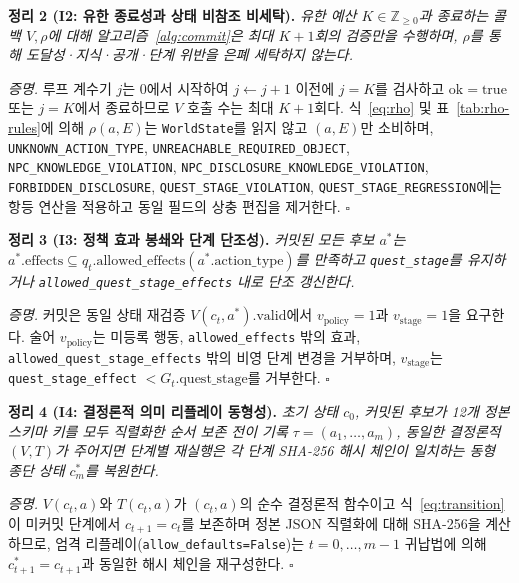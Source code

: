 \documentclass[journal]{IEEEtran}
\begin{document}
\noindent\textbf{정리 2 (I2: 유한 종료성과 상태 비참조 비세탁).} \emph{유한 예산 $K\in\mathbb{Z}_{\geq 0}$과 종료하는 콜백 $V,\rho$에 대해 알고리즘~\ref{alg:commit}은 최대 $K{+}1$회의 검증만을 수행하며, $\rho$를 통해 도달성·지식·공개·단계 위반을 은폐 세탁하지 않는다.}
\par\noindent\textit{증명.} 루프 계수기 $j$는 $0$에서 시작하여 $j\leftarrow j{+}1$ 이전에 $j=K$를 검사하고 $\mathrm{ok}=\mathrm{true}$ 또는 $j=K$에서 종료하므로 $V$ 호출 수는 최대 $K{+}1$회다. 식~\ref{eq:rho} 및 표~\ref{tab:rho-rules}에 의해 $\rho(a,E)$는 \texttt{WorldState}를 읽지 않고 $(a,E)$만 소비하며, \texttt{UNKNOWN\_\allowbreak ACTION\_\allowbreak TYPE}, \texttt{UNREACHABLE\_\allowbreak REQUIRED\_\allowbreak OBJECT}, \texttt{NPC\_}\allowbreak\texttt{KNOWLEDGE\_}\allowbreak\texttt{VIOLATION}, \texttt{NPC\_\allowbreak DISCLOSURE\_\allowbreak KNOWLEDGE\_\allowbreak VIOLATION}, \texttt{FORBIDDEN\_\allowbreak DISCLOSURE}, \texttt{QUEST\_\allowbreak STAGE\_\allowbreak VIOLATION}, \texttt{QUEST\_\allowbreak STAGE\_\allowbreak REGRESSION}에는 항등 연산을 적용하고 동일 필드의 상충 편집을 제거한다. \hfill$\square$

\noindent\textbf{정리 3 (I3: 정책 효과 봉쇄와 단계 단조성).} \emph{커밋된 모든 후보 $a^*$는 $a^*.\mathrm{effects}\subseteq q_t.\mathrm{allowed\_effects}(a^*.\mathrm{action\_type})$를 만족하고 \texttt{quest\_stage}를 유지하거나 \texttt{allowed\_quest\_stage\_effects} 내로 단조 갱신한다.}
\par\noindent\textit{증명.} 커밋은 동일 상태 재검증 $V(c_t,a^*).\mathrm{valid}$에서 $v_{\mathrm{policy}}=1$과 $v_{\mathrm{stage}}=1$을 요구한다. 술어 $v_{\mathrm{policy}}$는 미등록 행동, \texttt{allowed\_effects} 밖의 효과, \texttt{allowed\_quest\_stage\_effects} 밖의 비영 단계 변경을 거부하며, $v_{\mathrm{stage}}$는 \texttt{quest\_stage\_effect} $< G_t.\mathrm{quest\_stage}$를 거부한다. \hfill$\square$

\noindent\textbf{정리 4 (I4: 결정론적 의미 리플레이 동형성).} \emph{초기 상태 $c_0$, 커밋된 후보가 12개 정본 스키마 키를 모두 직렬화한 순서 보존 전이 기록 $\tau=(a_1,\dots,a_m)$, 동일한 결정론적 $(V,T)$가 주어지면 단계별 재실행은 각 단계 SHA-256 해시 체인이 일치하는 동형 종단 상태 $c_m^*$를 복원한다.}
\par\noindent\textit{증명.} $V(c_t,a)$와 $T(c_t,a)$가 $(c_t,a)$의 순수 결정론적 함수이고 식~\ref{eq:transition}이 미커밋 단계에서 $c_{t+1}=c_t$를 보존하며 정본 JSON 직렬화에 대해 SHA-256을 계산하므로, 엄격 리플레이(\texttt{allow\_defaults=False})는 $t=0,\dots,m{-}1$ 귀납법에 의해 $c_{t+1}^*=c_{t+1}$과 동일한 해시 체인을 재구성한다. \hfill$\square$
\end{document}
